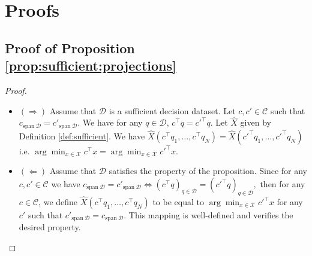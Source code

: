 \documentclass[11pt]{article}
\theoremstyle{plain}
\theoremstyle{definition}
\newcommand{\Vect}{\mathrm{span}~}
\newcommand{\sufficient}{sufficient decision dataset}
\newcommand{\cX}{\mathcal{X}}
\newcommand{\cC}{\mathcal{C}}
\newcommand{\cD}{\mathcal{D}}
\begin{document}
 




\newpage 





\newpage
\appendix

\section{Proofs}

\subsection{Proof of Proposition \ref{prop:sufficient:projections}}
\begin{proof} \;
    \begin{itemize}
        \item
        $(\Rightarrow)$ Assume that $\cD$ is a \sufficient{}. Let $c,c'\in \cC$ such that $c_{\Vect \cD}=c'_{\Vect \cD}$. We have for any $q\in \cD$, $c^\top q=c'^\top q$. Let $\hat{X}$ given by Definition \ref{def:sufficient}. We have $\hat X\left(c^\top q_1,\dots,c^\top q_N\right)=\hat X\left(c'^\top q_1,\dots,c'^\top q_N\right)$ i.e. $\arg\min_{x\in \cX}c^\top x=\arg\min_{x\in \cX}c'^\top x$.
        
        \item $(\Leftarrow)$ Assume that $\cD$ satisfies the property of the proposition. Since for any $c,c'\in \cC$ we have 
        $
            c_{\Vect \cD}=c'_{\Vect \cD}\Longleftrightarrow (c^\top q)_{q\in \cD}=(c'^\top q)_{q\in \cD},
        $
        then for any $c\in \cC$, we define $\hat X\left(c^\top q_1,\dots,c^\top q_N\right)$ to be equal to $\arg\min_{x\in \cX}c'^\top x$ for any $c'$ such that $c'_{\Vect \cD}=c_{\Vect \cD}$. This mapping is well-defined and verifies the desired property.
    \end{itemize}
\end{proof}
\end{document}
